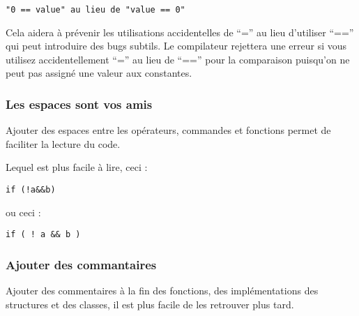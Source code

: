 \begin{verbatim}
"0 == value" au lieu de "value == 0"
\end{verbatim}

Cela aidera \`a pr\'evenir les utilisations accidentelles de ``='' au lieu d'utiliser ``=='' qui peut introduire des bugs subtils. Le compilateur rejettera une erreur si vous utilisez accidentellement ``='' au lieu de ``=='' pour la comparaison puisqu'on ne peut pas assign\'e une valeur aux constantes.

\subsubsection{Les espaces sont vos amis}
Ajouter des espaces entre les op\'erateurs, commandes et fonctions permet de faciliter la lecture du code.

Lequel est plus facile \`a lire, ceci :

\begin{verbatim}
if (!a&&b)
\end{verbatim}

ou ceci :

\begin{verbatim}
if ( ! a && b )
\end{verbatim}

\subsubsection{Ajouter des commantaires}
Ajouter des commentaires \`a la fin des fonctions, des impl\'ementations des structures et des classes, il est plus facile de les retrouver plus tard.


